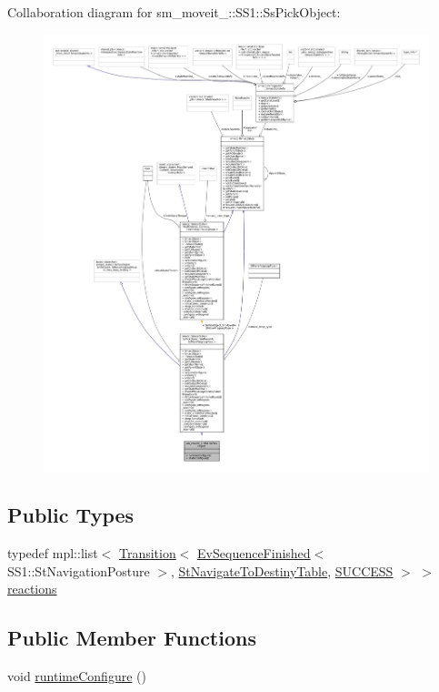 Collaboration diagram for sm\+\_\+moveit\+\_\+:\+:S\+S1\+:\+:Ss\+Pick\+Object\+:
\nopagebreak
\begin{figure}[H]
\begin{center}
\leavevmode
\includegraphics[width=350pt]{structsm__moveit__4_1_1SS1_1_1SsPickObject__coll__graph}
\end{center}
\end{figure}
\subsection*{Public Types}
\begin{DoxyCompactItemize}
\item 
typedef mpl\+::list$<$ \hyperlink{classsmacc_1_1Transition}{Transition}$<$ \hyperlink{structsmacc_1_1default__events_1_1EvSequenceFinished}{Ev\+Sequence\+Finished}$<$ S\+S1\+::\+St\+Navigation\+Posture $>$, \hyperlink{structsm__moveit__4_1_1StNavigateToDestinyTable}{St\+Navigate\+To\+Destiny\+Table}, \hyperlink{structsmacc_1_1default__transition__tags_1_1SUCCESS}{S\+U\+C\+C\+E\+SS} $>$ $>$ \hyperlink{structsm__moveit__4_1_1SS1_1_1SsPickObject_a91d86d49b71983c289daceda785cd5b2}{reactions}
\end{DoxyCompactItemize}
\subsection*{Public Member Functions}
\begin{DoxyCompactItemize}
\item 
void \hyperlink{structsm__moveit__4_1_1SS1_1_1SsPickObject_a00ddf11db72eb417a0e4221426722c02}{runtime\+Configure} ()
\end{DoxyCompactItemize}
